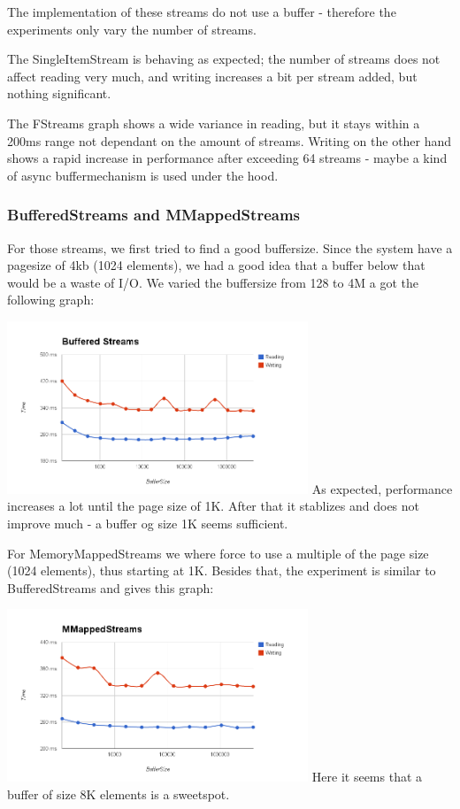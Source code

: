 The implementation of these streams do not use a buffer - therefore the experiments only vary the number of streams.

The SingleItemStream is behaving as expected; the number of streams does not affect reading very much, and writing increases a bit per stream added, but nothing significant. 

The FStreams graph shows a wide variance in reading, but it stays within a 200ms range not dependant on the amount of streams. Writing on the other hand shows a rapid increase in performance after exceeding 64 streams - maybe a kind of async buffermechanism is used under the hood.

\subsubsection{BufferedStreams and MMappedStreams}
For those streams, we first tried to find a good buffersize. Since the system have a pagesize of 4kb (1024 elements), we had a good idea that a buffer below that would be a waste of I/O. We varied the buffersize from 128 to 4M a got the following graph:

\includegraphics[width=90mm]{graphics/buffer_BS.png}
As expected, performance increases a lot until the page size of 1K. After that it stablizes and does not improve much - a buffer og size 1K seems sufficient.

For MemoryMappedStreams we where force to use a multiple of the page size (1024 elements), thus starting at 1K. Besides that, the experiment is similar to BufferedStreams and gives this graph:

\includegraphics[width=90mm]{graphics/buffer_MMS.png}
Here it seems that a buffer of size 8K elements is a sweetspot.


